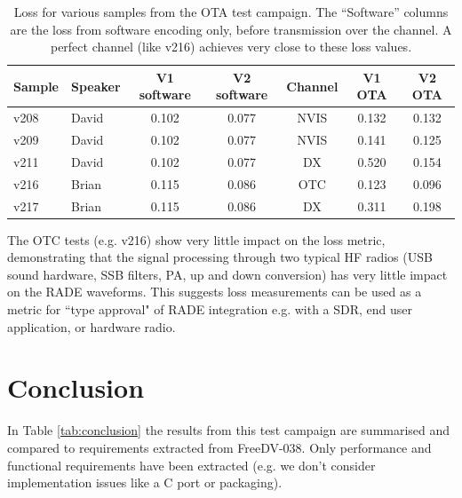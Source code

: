 \documentclass{article}
\begin{document}
\begin{table} [h]
\caption{Loss for various samples from the OTA test campaign. The “Software” columns are the loss from software encoding only, before transmission over the channel. A perfect channel (like v216) achieves very close to these loss values.}
\label{tab:ota_loss}
\centering
\begin{tabular}{ l | l | c | c | c | c | c }
 \hline
 Sample	& Speaker & V1 software & V2 software & Channel & V1 OTA & V2 OTA \\
 \hline
 v208 &	David &	0.102 &	0.077 &	NVIS & 0.132 & 0.132 \\
 v209 &	David &	0.102 &	0.077 &	NVIS & 0.141 & 0.125 \\
 v211 &	David & 0.102 &	0.077 &	DX   & 0.520 & 0.154 \\
 v216 &	Brian &	0.115 &	0.086 &	OTC  & 0.123 & 0.096 \\
 v217 &	Brian &	0.115 &	0.086 &	DX   & 0.311 & 0.198 \\
 \hline
\end{tabular}
\end{table}

The OTC tests (e.g. v216) show very little impact on the loss metric, demonstrating that the signal processing through two typical HF radios (USB sound hardware, SSB filters, PA, up and down conversion) has very little impact on the RADE waveforms. This suggests loss measurements can be used as a metric for ``type approval" of RADE integration e.g. with a SDR, end user application, or hardware radio.

\section{Conclusion}

In Table \ref{tab:conclusion} the results from this test campaign are summarised and compared to requirements extracted from FreeDV-038.  Only performance and functional requirements have been extracted (e.g. we don't consider implementation issues like a C port or packaging).
\end{document}
